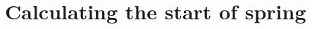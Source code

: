 \documentclass[a4paper,12pt]{article}
\begin{document}
\section{Calculating the start of spring}
\end{document}
